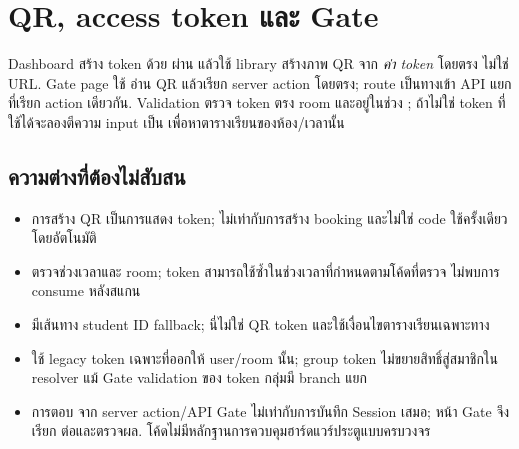 \chapter{QR, access token และ Gate}
Dashboard สร้าง token ด้วย  ผ่าน  แล้วใช้ library  สร้างภาพ QR จาก \emph{ค่า token} โดยตรง ไม่ใช่ URL. Gate page  ใช้  อ่าน QR แล้วเรียก server action  โดยตรง; route  เป็นทางเข้า API แยกที่เรียก action เดียวกัน. Validation ตรวจ token ตรง room และอยู่ในช่วง ; ถ้าไม่ใช่ token ที่ใช้ได้จะลองตีความ input เป็น  เพื่อหาตารางเรียนของห้อง/เวลานั้น
\section*{ความต่างที่ต้องไม่สับสน}
\begin{itemize}
\item การสร้าง QR เป็นการแสดง token; ไม่เท่ากับการสร้าง booking และไม่ใช่ code ใช้ครั้งเดียวโดยอัตโนมัติ
\item {} ตรวจช่วงเวลาและ room; token สามารถใช้ซ้ำในช่วงเวลาที่กำหนดตามโค้ดที่ตรวจ ไม่พบการ consume หลังสแกน
\item {} มีเส้นทาง student ID fallback; นี่ไม่ใช่ QR token และใช้เงื่อนไขตารางเรียนเฉพาะทาง
\item {} ใช้ legacy token เฉพาะที่ออกให้ user/room นั้น; group token ไม่ขยายสิทธิ์สู่สมาชิกใน resolver แม้ Gate validation ของ token กลุ่มมี branch แยก
\item การตอบ  จาก server action/API Gate ไม่เท่ากับการบันทึก Session เสมอ; หน้า Gate จึงเรียก  ต่อและตรวจผล. โค้ดไม่มีหลักฐานการควบคุมฮาร์ดแวร์ประตูแบบครบวงจร
\end{itemize}

